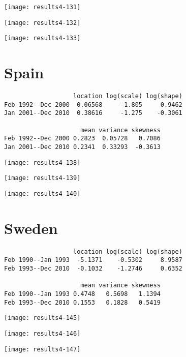\documentclass[a4paper]{article}
\begin{document}
\begin{center}
\texttt{[image: results4-131]}

\texttt{[image: results4-132]}

\texttt{[image: results4-133]}
\end{center}


\newpage

\section*{Spain}


\begin{verbatim}
                   location log(scale) log(shape)
Feb 1992--Dec 2000  0.06568     -1.805     0.9462
Jan 2001--Dec 2010  0.38616     -1.275    -0.3061

                     mean variance skewness
Feb 1992--Dec 2000 0.2823  0.05728   0.7086
Jan 2001--Dec 2010 0.2341  0.33293  -0.3613

\end{verbatim}

\begin{center}
\texttt{[image: results4-138]}

\texttt{[image: results4-139]}

\texttt{[image: results4-140]}
\end{center}


\newpage

\section*{Sweden}


\begin{verbatim}
                   location log(scale) log(shape)
Feb 1990--Jan 1993  -5.1371    -0.5302     8.9587
Feb 1993--Dec 2010  -0.1032    -1.2746     0.6352

                     mean variance skewness
Feb 1990--Jan 1993 0.4748   0.5698   1.1394
Feb 1993--Dec 2010 0.1553   0.1828   0.5419

\end{verbatim}

\begin{center}
\texttt{[image: results4-145]}

\texttt{[image: results4-146]}

\texttt{[image: results4-147]}
\end{center}
\end{document}
